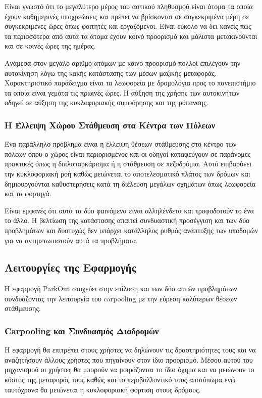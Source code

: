 \documentclass[11pt]{article}
\begin{document}
Είναι γνωστό ότι το μεγαλύτερο μέρος του αστικού πληθυσμού είναι άτομα τα
οποία έχουν καθημερινές υποχρεώσεις και πρέπει να βρίσκονται
σε συγκεκριμένα μέρη σε συγκεκριμένες ώρες όπως φοιτητές και εργαζόμενοι.
Είναι εύκολο να δει κανείς πως τα περισσότερα από αυτά τα άτομα
έχουν κοινό προορισμό και μάλιστα μετακινούνται και σε κοινές ώρες της
ημέρας.

Ανάμεσα στον μεγάλο αριθμό ατόμων με κοινό προορισμό πολλοί επιλέγουν
την αυτοκίνηση λόγω της κακής κατάστασης των μέσων μαζικής μεταφοράς.
Χαρακτηριστικό παράδειγμα είναι τα λεωφορεία με δρομολόγια προς το
πανεπιστήμιο τα οποία είναι γεμάτα τις πρωινές ώρες.
Η αύξηση της χρήσης των αυτοκινήτων οδηγεί σε αύξηση της
κυκλοφοριακής συμφόρησης και της ρύπανσης.

\subsubsection{Η Έλλειψη Χώρου Στάθμευση στα Κέντρα των Πόλεων}

Ένα παράλληλο πρόβλημα είναι η έλλειψη θέσεων στάθμευσης στο κέντρο
των πόλεων όπου ο χώρος είναι περιορισμένος και οι οδηγοί καταφεύγουν
σε παράνομες πρακτικές όπως η διπλοπαρκάρισμα ή η στάθμευση σε
πεζοδρόμια. Αυτό επιβαρύνει την κυκλοφοριακή ροή καθώς μειώνεται
το αποτελεσματικό πλάτος των δρόμων και δημιουργούνται καθυστερήσεις
κατά τη διέλευση μεγάλων οχημάτων όπως λεωφορεία και τα φορτηγά.

Είναι εμφανές ότι αυτά τα δύο φαινόμενα είναι αλληλένδετα και
τροφοδοτούν το ένα το άλλο. Η βελτίωση της κατάστασης απαιτεί
συνδυαστική προσέγγιση και των δύο προβλημάτων και δυστυχώς δεν
υπάρχει κατάλληλος ρυθμός ανάπτυξης των υποδομών για να
αντιμετωπιστούν αυτά τα προβλήματα.

\subsection{Λειτουργίες της Εφαρμογής}

Η εφαρμογή ParkOut στοχεύει στην επίλυση
και των δύο αυτών προβλημάτων συνδυάζοντας την λειτουργία του carpooling
με την εύρεση καλύτερων θέσεων στάθμευσης.

\subsubsection{Carpooling και Συνδυασμός Διαδρομών}

Η εφαρμογή θα επιτρέπει στους χρήστες να δηλώνουν τις δραστηριότητες τους
και να αναζητήσουν άλλους χρήστες που πηγαίνουν στον ίδιο προορισμό.
Μέσου αυτού του μηχανισμού οι χρήστες θα μπορούν να μοιράζονται το
ίδιο όχημα και να μειώνουν το κόστος της μεταφοράς τους καθώς και το
περιβαλλοντικό τους αποτύπωμα ενώ ταυτόχρονα θα μειώνεται η κυκλοφοριακή
φόρτιση στους δρόμους.
\end{document}
